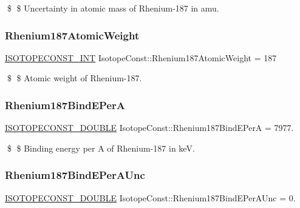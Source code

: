\$ \$ Uncertainty in atomic mass of Rhenium-\/187 in amu. \mbox{\label{group___isotope_const-_rhenium-_re187_ga3faa645d7d88c65f69d6405135453fa4}} 
\subsubsection{\texorpdfstring{Rhenium187\+Atomic\+Weight}{Rhenium187AtomicWeight}}
{\footnotesize\ttfamily \mbox{\hyperlink{group___isotope_const-_macros_ga5f18360b3e99483a35c32d789e62621c}{I\+S\+O\+T\+O\+P\+E\+C\+O\+N\+S\+T\+\_\+\+I\+NT}} Isotope\+Const\+::\+Rhenium187\+Atomic\+Weight = 187}

\$ \$ Atomic weight of Rhenium-\/187. \mbox{\label{group___isotope_const-_rhenium-_re187_ga0a1171fcc9505093451a90addd2d4915}} 
\subsubsection{\texorpdfstring{Rhenium187\+Bind\+E\+PerA}{Rhenium187BindEPerA}}
{\footnotesize\ttfamily \mbox{\hyperlink{group___isotope_const-_macros_ga8f45a7272ce02c0b4c65c44636ed719a}{I\+S\+O\+T\+O\+P\+E\+C\+O\+N\+S\+T\+\_\+\+D\+O\+U\+B\+LE}} Isotope\+Const\+::\+Rhenium187\+Bind\+E\+PerA = 7977.}

\$ \$ Binding energy per A of Rhenium-\/187 in keV. \mbox{\label{group___isotope_const-_rhenium-_re187_ga8d40081a5bfd2b651b5b480c4474c0ae}} 
\subsubsection{\texorpdfstring{Rhenium187\+Bind\+E\+Per\+A\+Unc}{Rhenium187BindEPerAUnc}}
{\footnotesize\ttfamily \mbox{\hyperlink{group___isotope_const-_macros_ga8f45a7272ce02c0b4c65c44636ed719a}{I\+S\+O\+T\+O\+P\+E\+C\+O\+N\+S\+T\+\_\+\+D\+O\+U\+B\+LE}} Isotope\+Const\+::\+Rhenium187\+Bind\+E\+Per\+A\+Unc = 0.}

